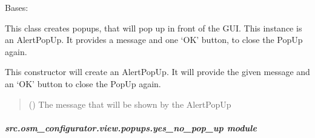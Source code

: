 \documentclass[letterpaper,10pt,english]{sphinxmanual}
\begin{document}
\begin{fulllineitems}
\label{\detokenize{apidoc/src.osm_configurator.view.popups:src.osm_configurator.view.popups.alert_pop_up.AlertPopUp}}
\pysigstartsignatures
{}
\pysigstopsignatures
\sphinxAtStartPar
Bases: 

\sphinxAtStartPar
This class creates popups, that will pop up in front of the GUI.
This instance is an Alert\sphinxhyphen{}PopUp. It provides a message and one ‘OK’ button, to close the PopUp again.

\begin{fulllineitems}
\label{\detokenize{apidoc/src.osm_configurator.view.popups:src.osm_configurator.view.popups.alert_pop_up.AlertPopUp.__init__}}
\pysigstartsignatures
{}
\pysigstopsignatures
\sphinxAtStartPar
This constructor will create an AlertPopUp. It will provide the given message and an ‘OK’ button to close
the PopUp again.
\begin{quote}\begin{description}
\sphinxAtStartPar
{} () \textendash{} The message that will be shown by the AlertPopUp

\end{description}\end{quote}

\end{fulllineitems}


\end{fulllineitems}



\subparagraph{src.osm\_configurator.view.popups.yes\_no\_pop\_up module}
\label{\detokenize{apidoc/src.osm_configurator.view.popups:module-src.osm_configurator.view.popups.yes_no_pop_up}}\label{\detokenize{apidoc/src.osm_configurator.view.popups:src-osm-configurator-view-popups-yes-no-pop-up-module}}
\end{document}
